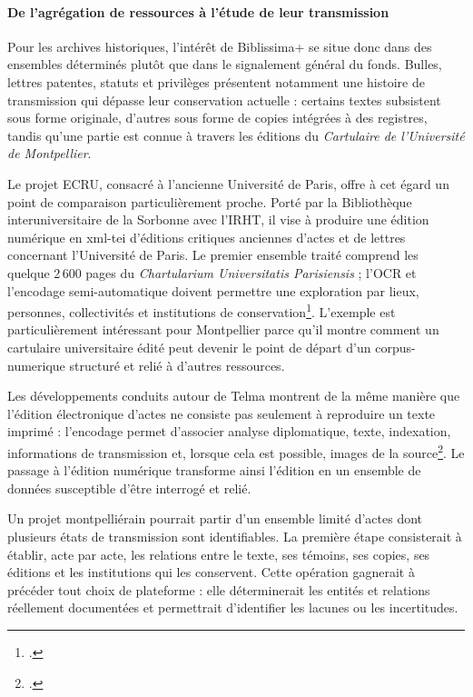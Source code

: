 \paragraph{De l'agrégation de ressources à l'étude de leur transmission}

Pour les archives historiques, l'intérêt de Biblissima+ se situe donc dans des ensembles déterminés plutôt que dans le \gls{signalement} général du fonds. Bulles, lettres patentes, statuts et privilèges présentent notamment une histoire de transmission qui dépasse leur conservation actuelle : certains textes subsistent sous forme originale, d'autres sous forme de copies intégrées à des registres, tandis qu'une partie est connue à travers les éditions du \emph{Cartulaire de l'Université de Montpellier}.

Le projet ECRU, consacré à l'ancienne Université de Paris, offre à cet égard un point de comparaison particulièrement proche. Porté par la Bibliothèque interuniversitaire de la Sorbonne avec l'IRHT, il vise à produire une édition numérique en \gls{xml}-\gls{tei} d'éditions critiques anciennes d'actes et de lettres concernant l'Université de Paris. Le premier ensemble traité comprend les quelque 2\,600 pages du \emph{Chartularium Universitatis Parisiensis} ; l'OCR et l'encodage semi-automatique doivent permettre une exploration par lieux, personnes, collectivités et institutions de conservation\footcite{BiblissimaECRU}. L'exemple est particulièrement intéressant pour Montpellier parce qu'il montre comment un cartulaire universitaire édité peut devenir le point de départ d'un \gls{corpus-numerique} structuré et relié à d'autres ressources.

Les développements conduits autour de Telma montrent de la même manière que l'édition électronique d'actes ne consiste pas seulement à reproduire un texte imprimé : l'encodage permet d'associer analyse diplomatique, texte, indexation, informations de transmission et, lorsque cela est possible, images de la source\footcite{BertrandTelma2016}. Le passage à l'édition numérique transforme ainsi l'édition en un ensemble de données susceptible d'être interrogé et relié.

Un projet montpelliérain pourrait partir d'un ensemble limité d'actes dont plusieurs états de transmission sont identifiables. La première étape consisterait à établir, acte par acte, les relations entre le texte, ses témoins, ses copies, ses éditions et les institutions qui les conservent. Cette opération gagnerait à précéder tout choix de plateforme : elle déterminerait les entités et relations réellement documentées et permettrait d'identifier les lacunes ou les incertitudes.


